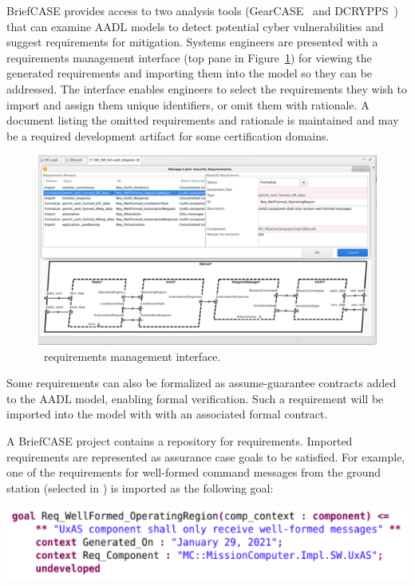 BriefCASE provides access to two analysis tools (GearCASE~\cite{gearcase2020} and
DCRYPPS~\cite{dcrypps2019}) that can examine AADL models to detect potential cyber vulnerabilities
and suggest requirements for mitigation.
%
Systems engineers are %
presented with a requirements management interface
(top pane in Figure~\ref{fig:req-mgmt}) for viewing the generated requirements and importing them into the model
so they can be addressed. The interface enables engineers to select the requirements they wish to
import and assign them unique identifiers, or omit them with rationale. A document listing the omitted
requirements and rationale is maintained and may be a required development artifact for some
certification domains. 

\begin{figure}[h]
	\centering
	\includegraphics[width=\textwidth]{figs/req-mgmt.png}
	\caption{\briefcase \ requirements management interface.} 
	\label{fig:req-mgmt} 
\end{figure}

Some requirements can also be formalized as assume-guarantee contracts
added to the AADL model, enabling formal verification. 
Such a requirement will be imported into the model with with an associated formal
contract.

A BriefCASE project contains a repository for requirements. Imported requirements are represented 
as assurance case goals to be satisfied. For example, one of the requirements for well-formed 
command messages from the ground station (selected in ) is imported as the following goal:

\noindent
\includegraphics[width=1\columnwidth]{figs/req-wellformed-or.png}

